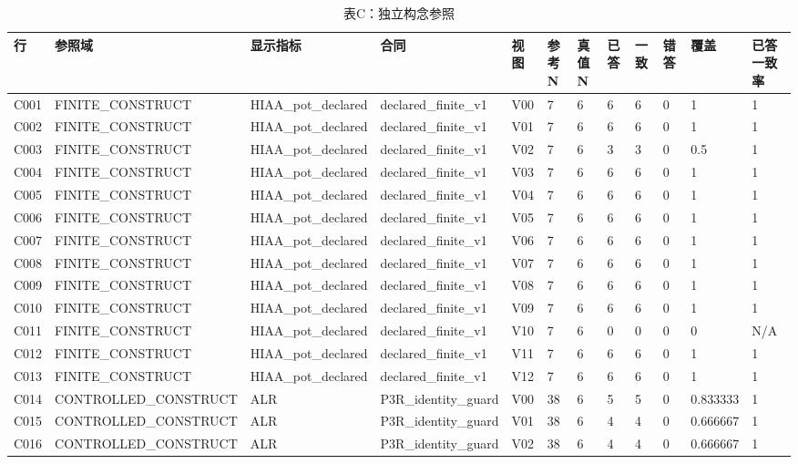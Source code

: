 \begin{longtable}{llllllllllll}
\caption{表C：独立构念参照}\\
\hline
行 & 参照域 & 显示指标 & 合同 & 视图 & 参考N & 真值N & 已答 & 一致 & 错答 & 覆盖 & 已答一致率 \\
\hline\endhead
C001 & FINITE\_CONSTRUCT & HIAA\_pot\_declared & declared\_finite\_v1 & V00 & 7 & 6 & 6 & 6 & 0 & 1 & 1 \\
C002 & FINITE\_CONSTRUCT & HIAA\_pot\_declared & declared\_finite\_v1 & V01 & 7 & 6 & 6 & 6 & 0 & 1 & 1 \\
C003 & FINITE\_CONSTRUCT & HIAA\_pot\_declared & declared\_finite\_v1 & V02 & 7 & 6 & 3 & 3 & 0 & 0.5 & 1 \\
C004 & FINITE\_CONSTRUCT & HIAA\_pot\_declared & declared\_finite\_v1 & V03 & 7 & 6 & 6 & 6 & 0 & 1 & 1 \\
C005 & FINITE\_CONSTRUCT & HIAA\_pot\_declared & declared\_finite\_v1 & V04 & 7 & 6 & 6 & 6 & 0 & 1 & 1 \\
C006 & FINITE\_CONSTRUCT & HIAA\_pot\_declared & declared\_finite\_v1 & V05 & 7 & 6 & 6 & 6 & 0 & 1 & 1 \\
C007 & FINITE\_CONSTRUCT & HIAA\_pot\_declared & declared\_finite\_v1 & V06 & 7 & 6 & 6 & 6 & 0 & 1 & 1 \\
C008 & FINITE\_CONSTRUCT & HIAA\_pot\_declared & declared\_finite\_v1 & V07 & 7 & 6 & 6 & 6 & 0 & 1 & 1 \\
C009 & FINITE\_CONSTRUCT & HIAA\_pot\_declared & declared\_finite\_v1 & V08 & 7 & 6 & 6 & 6 & 0 & 1 & 1 \\
C010 & FINITE\_CONSTRUCT & HIAA\_pot\_declared & declared\_finite\_v1 & V09 & 7 & 6 & 6 & 6 & 0 & 1 & 1 \\
C011 & FINITE\_CONSTRUCT & HIAA\_pot\_declared & declared\_finite\_v1 & V10 & 7 & 6 & 0 & 0 & 0 & 0 & N/A \\
C012 & FINITE\_CONSTRUCT & HIAA\_pot\_declared & declared\_finite\_v1 & V11 & 7 & 6 & 6 & 6 & 0 & 1 & 1 \\
C013 & FINITE\_CONSTRUCT & HIAA\_pot\_declared & declared\_finite\_v1 & V12 & 7 & 6 & 6 & 6 & 0 & 1 & 1 \\
C014 & CONTROLLED\_CONSTRUCT & ALR & P3R\_identity\_guard & V00 & 38 & 6 & 5 & 5 & 0 & 0.833333 & 1 \\
C015 & CONTROLLED\_CONSTRUCT & ALR & P3R\_identity\_guard & V01 & 38 & 6 & 4 & 4 & 0 & 0.666667 & 1 \\
C016 & CONTROLLED\_CONSTRUCT & ALR & P3R\_identity\_guard & V02 & 38 & 6 & 4 & 4 & 0 & 0.666667 & 1 \\

\end{longtable}
